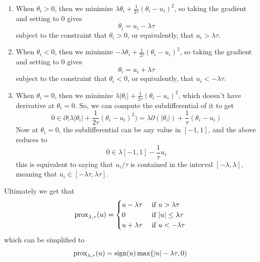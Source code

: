   \begin{enumerate}
    \item When $\theta_i > 0$, then we minimize $\lambda \theta_i + \frac{1}{2\tau} (\theta_i - u_i)^2$, so taking the gradient and setting to $0$ gives 
    \begin{equation}
      \theta_i = u_i - \lambda \tau
    \end{equation}
    subject to the constraint that $\theta_i > 0$, or equivalently, that $u_i > \lambda \tau$. 

    \item When $\theta_i < 0$, then we minimize $-\lambda \theta_i + \frac{1}{2\tau} ( \theta_i - u_i)^2$, so taking the gradient and setting to $0$ gives 
    \begin{equation}
      \theta_i = u_i + \lambda \tau
    \end{equation}
    subject to the constraint that $\theta_i < 0$, or equivalently, that $u_i < -\lambda \tau$. 

    \item When $\theta_i = 0$, then we minimize $\lambda |\theta_i| + \frac{1}{2\tau} (\theta_i - u_i)^2$, which doesn't have derivative at $\theta_i = 0$. So, we can compute the subdifferential of it to get 
    \[0 \in \partial \bigg( \lambda |\theta_i| + \frac{1}{2\tau} (\theta_i - u_i)^2 \bigg) = \lambda \partial (|\theta_i|) + \frac{1}{\tau} (\theta_i - u_i)\]
    Now at $\theta_i = 0$, the subdifferential can be any value in $[-1, 1]$, and the above reduces to 
    \begin{equation}
      0 \in \lambda [-1, 1] - \frac{1}{\tau} u_i
    \end{equation}
    this is equivalent to saying that $u_i/\tau$ is contained in the interval $[-\lambda, \lambda]$, meaning that $u_i \in [-\lambda \tau, \lambda \tau]$. 
  \end{enumerate}

  Ultimately we get that 
  \begin{equation}
    \prox_{\lambda, \tau} (u) = \begin{cases} u - \lambda \tau & \text{ if } u > \lambda \tau \\ 0 & \text{ if } |u| \leq \lambda \tau \\ u + \lambda \tau & \text{ if } u < - \lambda \tau \end{cases}
  \end{equation}
  which can be simplified to 
  \begin{equation}
    \prox_{\lambda, \tau} (u) = \mathrm{sign}(u) \max\{ |u| - \lambda \tau, 0)
  \end{equation}

